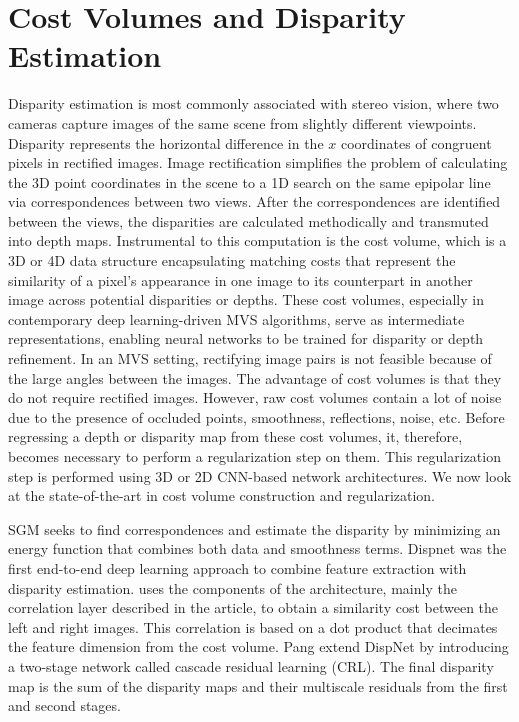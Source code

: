 \section{Cost Volumes and Disparity Estimation}\label{sec:relwork-dispes}
Disparity estimation is most commonly associated with stereo vision, where two cameras capture images of the same scene from slightly different viewpoints. Disparity represents the horizontal difference in the $x$ coordinates of congruent pixels in rectified images. Image rectification simplifies the problem of calculating the 3D point coordinates in the scene to a 1D search on the same epipolar line via correspondences between two views. After the correspondences are identified between the views, the disparities are calculated methodically and transmuted into depth maps. Instrumental to this computation is the cost volume, which is a 3D or 4D data structure encapsulating matching costs that represent the similarity of a pixel's appearance in one image to its counterpart in another image across potential disparities or depths. These cost volumes, especially in contemporary deep learning-driven MVS algorithms, serve as intermediate representations, enabling neural networks to be trained for disparity or depth refinement. In an MVS setting, rectifying image pairs is not feasible because of the large angles between the images. The advantage of cost volumes is that they do not require rectified images. However, raw cost volumes contain a lot of noise due to the presence of occluded points, smoothness, reflections, noise, etc. Before regressing a depth or disparity map from these cost volumes, it, therefore, becomes necessary to perform a regularization step on them. This regularization step is performed using 3D or 2D CNN-based network architectures. We now look at the state-of-the-art in cost volume construction and regularization.\par
SGM \cite{1467526} seeks to find correspondences and estimate the disparity by minimizing an energy function that combines both data and smoothness terms. 
Dispnet \cite{Mayer2016} was the first end-to-end deep learning approach to combine feature extraction with disparity estimation. {\rmvd} uses the components of the {\dispn} architecture, mainly the correlation layer described in the article, to obtain a similarity cost between the left and right images. This correlation is based on a dot product that decimates the feature dimension from the cost volume. Pang {\etal} \cite{pang2017cascade} extend DispNet by introducing a two-stage network called cascade residual learning (CRL). The final disparity map is the sum of the disparity maps and their multiscale residuals from the first and second stages.\par 
